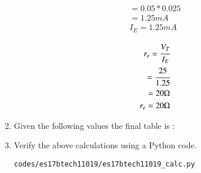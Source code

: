 \begin{enumerate}[label=\thesubsection.\arabic*.,ref=\thesubsection.\theenumi]
\begin{align}
              = 0.05 * 0.025\\
              
              = 1.25 mA\\
            
        I_{E} = 1.25 mA

\end{align}     
     
\begin{align}
    
        r_{e} = \cfrac{V_{T}}{I_{E}}\\
              
              = \cfrac{25}{1.25}\\
              
              = 20 \ohm\\
 
        r_{e} = 20 \ohm
        
\end{align}

\item
Given the following values the final table is : 
\begin{table}[!ht]
\centering

\caption{}
\label{table: Output_Table}
\end{table}


\item
Verify the above calculations using a Python code.\\

\solution
\begin{lstlisting}
codes/es17btech11019/es17btech11019_calc.py
\end{lstlisting}

\end{enumerate}